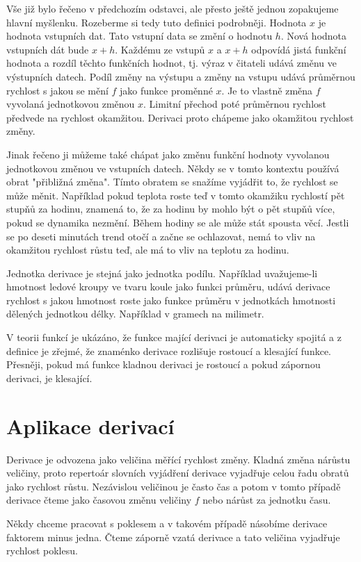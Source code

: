 \documentclass[12pt]{article}
\begin{document}
Vše již bylo řečeno v předchozím odstavci, ale přesto ještě jednou zopakujeme hlavní myšlenku. Rozeberme si tedy tuto definici podrobněji. Hodnota $x$ je hodnota vstupních dat. Tato vstupní data se změní o hodnotu $h$. Nová hodnota vstupních dát bude $x+h$. Každému ze  vstupů $x$ a $x+h$ odpovídá  jistá funkční hodnota a rozdíl těchto funkčních hodnot, tj. výraz v čitateli udává změnu ve výstupních  datech.  Podíl změny na výstupu a změny na vstupu udává průměrnou rychlost s jakou se mění $f$ jako funkce proměnné $x$.  Je to vlastně změna $f$ vyvolaná jednotkovou změnou $x$.  Limitní přechod poté průměrnou rychlost předvede na rychlost okamžitou. Derivaci proto chápeme jako okamžitou rychlost změny.

Jinak řečeno ji můžeme také chápat jako změnu funkční hodnoty vyvolanou jednotkovou změnou ve vstupních datech. Někdy se v tomto kontextu používá obrat "přibližná změna". Tímto obratem se snažíme vyjádřit to, že rychlost se může měnit. Například pokud teplota roste teď v tomto okamžiku rychlostí pět stupňů za hodinu, znamená to, že za hodinu by mohlo být o pět stupňů více, pokud se dynamika nezmění. Během hodiny se ale může stát spousta věcí. Jestli se po deseti minutách trend otočí a začne se ochlazovat, nemá to vliv na okamžitou rychlost růstu teď, ale má to vliv na teplotu za hodinu.

Jednotka derivace je stejná jako jednotka podílu. Například uvažujeme-li hmotnost ledové kroupy ve tvaru koule jako funkci průměru, udává derivace rychlost s jakou hmotnost roste jako funkce průměru v jednotkách hmotnosti dělených jednotkou délky. Například v gramech na milimetr.

V teorii funkcí je ukázáno, že funkce mající derivaci je automaticky spojitá a z definice je zřejmé, že znaménko derivace rozlišuje rostoucí a klesající funkce. Přesněji, pokud má funkce kladnou derivaci je rostoucí a pokud zápornou derivaci, je klesající.

\section*{Aplikace derivací}

Derivace je odvozena jako veličina měřící rychlost změny. Kladná změna nárůstu veličiny, proto repertoár slovních vyjádření derivace vyjadřuje celou řadu obratů jako rychlost růstu. Nezávislou veličinou je často čas a potom v tomto případě derivace čteme jako časovou změnu veličiny $f$ nebo nárůst za jednotku času.

Někdy chceme pracovat s poklesem a v takovém případě násobíme derivace faktorem minus jedna. Čteme záporně vzatá derivace a tato veličina vyjadřuje rychlost poklesu.
\end{document}
